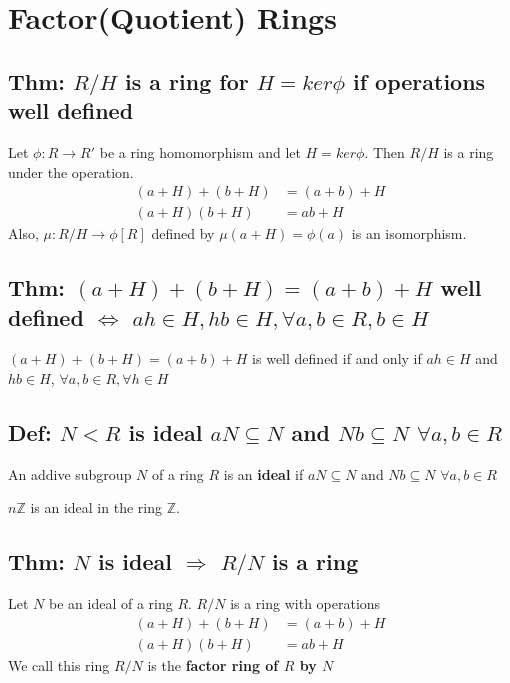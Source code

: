 \documentclass[11pt]{elegantbook}
\begin{document}
\section{Factor(Quotient) Rings}
\subsection{Thm: $R/H$ is a ring for $H=ker\phi$ if operations well defined}
\begin{theorem}
    Let $\phi: R \rightarrow R'$ be a ring homomorphism and let $H=ker\phi$. Then $R/H$ is a ring under the operation.
    \begin{equation}
        \begin{aligned}
            (a+H)+(b+H)&=(a+b)+H\\
            (a+H)(b+H)&=ab+H
        \end{aligned}
        \nonumber
    \end{equation}
    Also, $\mu: R/H \rightarrow	\phi[R]$ defined by $\mu(a+H)=\phi(a)$ is an isomorphism.
\end{theorem}

\subsection{Thm: $(a+H)+(b+H)=(a+b)+H$ well defined $\Leftrightarrow$ $ah\in H,hb\in H,\forall a,b\in R,b\in H$}
\begin{theorem}
    $(a+H)+(b+H)=(a+b)+H$ is well defined if and only if $ah\in H$ and $hb\in H$, $\forall a,b\in R,\forall h\in H$
\end{theorem}

\subsection{Def: $N< R$ is ideal $aN\subseteq N$ and $Nb\subseteq N$ $\forall a,b\in R$}
\begin{definition}
    An addive subgroup $N$ of a ring $R$
    is an \textbf{ideal} if  $aN\subseteq N$ and $Nb\subseteq N$ $\forall a,b\in R$
\end{definition}
\begin{example}
    $n \mathbb{Z}$ is an ideal in the ring $\mathbb{Z}$.
\end{example}

\subsection{Thm: $N$ is ideal $\Rightarrow$ $R/N$ is a ring}
\begin{theorem}
Let $N$ be an ideal of a ring $R$. $R/N$ is a ring with operations
\begin{equation}
    \begin{aligned}
        (a+H)+(b+H)&=(a+b)+H\\
        (a+H)(b+H)&=ab+H
    \end{aligned}
    \nonumber
\end{equation}
We call this ring $R/N$ is the \textbf{factor ring of $R$ by $N$}
\end{theorem}
\end{document}
